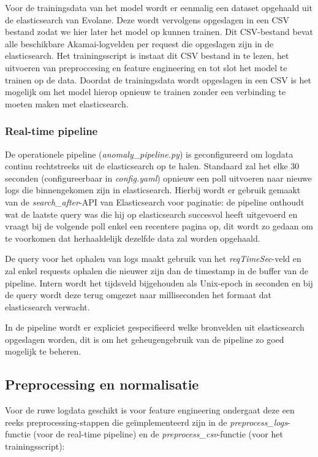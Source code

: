 Voor de trainingsdata van het model wordt er eenmalig een dataset opgehaald uit de elasticsearch van Evolane. Deze wordt vervolgens opgeslagen in een CSV bestand zodat we hier later het model op kunnen trainen. Dit CSV-bestand bevat alle beschikbare Akamai-logvelden per request die opgeslagen zijn in de elasticsearch. 
Het trainingsscript is instaat dit CSV bestand in te lezen, het uitvoeren van preproccesing en feature engineering en tot slot het model te trainen op de data. Doordat de trainingsdata wordt opgeslagen in een CSV is het mogelijk om het model hierop opnieuw te trainen zonder een verbinding te moeten maken met elasticsearch. 

\subsubsection{Real-time pipeline} 
\label{subsubsec:ophalen-pipeline}

De operationele pipeline (\textit{anomaly\_pipeline.py}) is geconfigureerd om logdata continu rechtstreeks uit de elasticsearch op te halen. Standaard zal het elke 30 seconden (configureerbaar in \textit{config.yaml}) opnieuw een poll uitvoeren naar nieuwe logs die binnengekomen zijn in elasticsearch.
Hierbij wordt er gebruik gemaakt van de \textit{search\_after}-API van Elasticsearch voor paginatie: de pipeline onthoudt wat de laatste query was die hij op elasticsearch succesvol heeft uitgevoerd en vraagt bij de volgende poll enkel een recentere pagina op, dit wordt zo gedaan om te voorkomen dat herhaaldelijk dezelfde data zal worden opgehaald. 

De query voor het ophalen van logs maakt gebruik van het \textit{reqTimeSec}-veld en zal enkel requests ophalen die nieuwer zijn dan de timestamp in de buffer van de pipeline. Intern wordt het tijdsveld bijgehouden als Unix-epoch in seconden en bij de query wordt deze terug omgezet naar milliseconden het formaat dat elasticsearch verwacht. 

In de pipeline wordt er expliciet gespecifieerd welke bronvelden uit elasticsearch opgeslagen worden, dit is om het geheugengebruik van de pipeline zo goed mogelijk te beheren. 

\subsection{Preprocessing en normalisatie} 
\label{subsec:preprocessing-normalisatie}

Voor de ruwe logdata geschikt is voor feature engineering ondergaat deze een reeks preprocessing-stappen die geïmplementeerd zijn in de \textit{preprocess\_logs}-functie (voor de real-time pipeline) en de \textit{preprocess\_csv}-functie (voor het trainingsscript):

